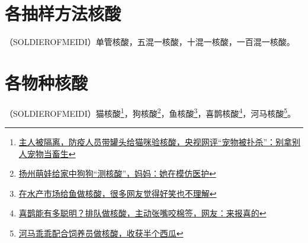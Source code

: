\documentclass{ctexbook}
\begin{document}
\section{各抽样方法核酸}
（SOLDIEROFMEIDI）单管核酸，五混一核酸，十混一核酸，一百混一核酸。

\section{各物种核酸}
（SOLDIEROFMEIDI）猫核酸\footnote{\href{https://www.163.com/dy/article/GOS3PHOI05199NPP.html}{主人被隔离，防疫人员带罐头给猫咪验核酸，央视网评“宠物被扑杀”：别拿别人宠物当畜生}}，狗核酸\footnote{\href{https://www.thepaper.cn/newsDetail_forward_13916282}{扬州萌娃给家中狗狗“测核酸”，妈妈：她在模仿医护}}，鱼核酸\footnote{\href{https://www.163.com/dy/article/H3KS18UU0552Y6AK.html}{在水产市场给鱼做核酸，很多网友觉得好笑也不理解}}，喜鹊核酸\footnote{\href{https://www.163.com/dy/article/GUR8U0RM0522CD4O.html}{喜鹊能有多聪明？排队做核酸，主动张嘴咬棉签，网友：来报喜的}}，河马核酸\footnote{\href{https://www.thepaper.cn/newsDetail_forward_17997745}{河马乖乖配合饲养员做核酸，收获半个西瓜}}。
\end{document}
